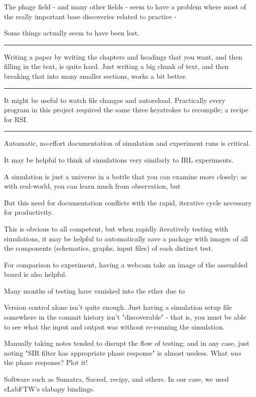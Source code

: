 \documentclass[paper.tex]{subfiles}
\begin{document}
The phage field - and many other fields - seem to have a problem where most of the really important base discoveries related to practice - 

Some things actually seem to have been lost.

\rule{\linewidth}{0.2pt}

Writing a paper by writing the chapters and headings that you want, and then filling in the text, is quite hard. Just writing a big chunk of text, and then breaking that into many smaller sections, works a bit better.


\rule{\linewidth}{0.2pt}

It might be useful to watch file changes and autoreload. Practically every program in this project required the same three keystrokes to recompile; a recipe for RSI.

\rule{\linewidth}{0.2pt}

Automatic, no-effort documentation of simulation and experiment runs is critical.

It may be helpful to think of simulations very similarly to IRL experiments. 

A simulation is just a universe in a bottle that you can examine more closely; as with real-world, you can learn much from observation, but 

But this need for documentation conflicts with the rapid, iterative cycle necessary for productivity.

This is obvious to all competent, but when rapidly iteratively testing with simulations, it may be helpful to automatically save a package with images of all the components (schematics, graphs, input files) of each distinct test. 

For comparison to experiment, having a webcam take an image of the assembled board is also helpful. 

Many months of testing have vanished into the ether due to 

Version control alone isn't quite enough. Just having a simulation setup file somewhere in the commit history isn't "discoverable" - that is, you must be able to see what the input and output was without re-running the simulation. 

Manually taking notes tended to disrupt the flow of testing; and in any case, just noting "SIR filter has appropriate phase response" is almost useless. What {\it was} the phase response? Plot it!

Software such as Sumatra, Sacred, recipy, and others. In our case, we used eLabFTW's elabapy bindings.
\end{document}
